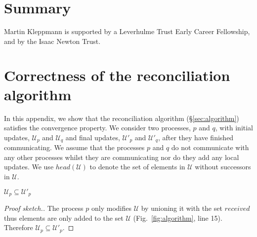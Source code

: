 \documentclass[manuscript,anonymous]{acmart}
\begin{document}


\section{Summary}

\begin{acks}
Martin Kleppmann is supported by a Leverhulme Trust Early Career Fellowship, and by the Isaac Newton Trust.
\end{acks}




\appendix
\section{Correctness of the reconciliation algorithm}

In this appendix, we show that the reconciliation algorithm (\S\ref{sec:algorithm}) satisfies the convergence property.
We consider two processes, $p$ and $q$, with initial updates, $\mathcal{U}_p$ and $\mathcal{U}_q$ and final updates, $\mathcal{U}'_p$ and $\mathcal{U}'_q$, after they have finished communicating.
We assume that the processes $p$ and $q$ do not communicate with any other processes whilst they are communicating nor do they add any local updates.
We use $\mathit{head}(\mathcal{U})$ to denote the set of elements in $\mathcal{U}$ without successors in $\mathcal{U}$.

\begin{lemma}\label{lemma:no-p-missing}
$\mathcal{U}_p \subseteq \mathcal{U}'_p$
\end{lemma}
\begin{proof}[Proof sketch.]
The process $p$ only modifies $\mathcal{U}$ by unioning it with the set $\mathit{received}$ thus elements are only added to the set $\mathcal{U}$ (Fig.~\ref{fig:algorithm}, line 15). 
Therefore $\mathcal{U}_p \subseteq \mathcal{U}'_p$.
\end{proof}
\end{document}
